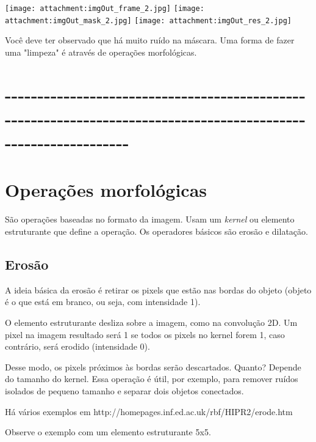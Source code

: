 \documentclass[11pt]{article}
\makeatletter
\def\maxwidth{\ifdim\Gin@nat@width>\linewidth\linewidth
    \else\Gin@nat@width\fi}
\let\Oldincludegraphics\includegraphics
\renewcommand{\includegraphics}[1]{\Oldincludegraphics[width=.8\maxwidth]{#1}}
\makeatother
\begin{document}
    \texttt{[image: attachment:imgOut\_frame\_2.jpg]}
\texttt{[image: attachment:imgOut\_mask\_2.jpg]}
\texttt{[image: attachment:imgOut\_res\_2.jpg]}

    Você deve ter observado que há muito ruído na máscara. Uma forma de
fazer uma "limpeza" é através de operações morfológicas.

    \section{-\/-\/-\/-\/-\/-\/-\/-\/-\/-\/-\/-\/-\/-\/-\/-\/-\/-\/-\/-\/-\/-\/-\/-\/-\/-\/-\/-\/-\/-\/-\/-\/-\/-\/-\/-\/-\/-\/-\/-\/-\/-\/-\/-\/-\/-\/-\/-\/-\/-\/-\/-\/-\/-\/-\/-\/-\/-\/-\/-\/-\/-\/-\/-\/-\/-\/-\/-\/-\/-\/-\/-\/-\/-\/-\/-\/-\/-\/-\/-\/-\/-\/-\/-\/-\/-\/-\/-\/-\/-\/-\/-\/-\/-\/-\/-\/-\/-\/-\/-\/-\/-\/-\/-\/-\/-\/-\/-\/-\/-\/-}\label{section}

\section{Operações morfológicas}\label{operauxe7uxf5es-morfoluxf3gicas}

    São operações baseadas no formato da imagem. Usam um \emph{kernel} ou
elemento estruturante que define a operação. Os operadores básicos são
erosão e dilatação.

    \subsection{Erosão}\label{erosuxe3o}

A ideia básica da erosão é retirar os pixels que estão nas bordas do
objeto (objeto é o que está em branco, ou seja, com intensidade 1).

O elemento estruturante desliza sobre a imagem, como na convolução 2D.
Um pixel na imagem resultado será 1 se todos os pixels no kernel forem
1, caso contrário, será erodido (intensidade 0).

Desse modo, os pixels próximos às bordas serão descartados. Quanto?
Depende do tamanho do kernel. Essa operação é útil, por exemplo, para
remover ruídos isolados de pequeno tamanho e separar dois objetos
conectados.

Há vários exemplos em http://homepages.inf.ed.ac.uk/rbf/HIPR2/erode.htm

Observe o exemplo com um elemento estruturante 5x5.
\end{document}
